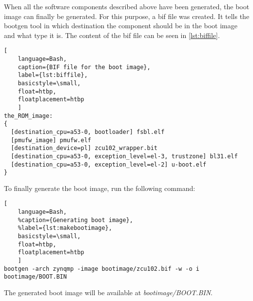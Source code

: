 When all the software components described above have been generated, the boot image can finally be generated. For this purpose, a \gls{bif} file was created. It tells the bootgen tool in which destination the component should be in the boot image and what type it is. The content of the \gls{bif} file can be seen in \cref{lst:biffile}.
\begin{lstlisting}[
	language=Bash,
	caption={BIF file for the boot image},
	label={lst:biffile},
	basicstyle=\small,
	float=htbp,
	floatplacement=htbp
	]
the_ROM_image:
{
  [destination_cpu=a53-0, bootloader] fsbl.elf
  [pmufw_image] pmufw.elf
  [destination_device=pl] zcu102_wrapper.bit
  [destination_cpu=a53-0, exception_level=el-3, trustzone] bl31.elf
  [destination_cpu=a53-0, exception_level=el-2] u-boot.elf
}
\end{lstlisting}

To finally generate the boot image, run the following command:
\begin{lstlisting}[
	language=Bash,
	%caption={Generating boot image},
	%label={lst:makebootimage},
	basicstyle=\small,
	float=htbp,
	floatplacement=htbp
	]
bootgen -arch zynqmp -image bootimage/zcu102.bif -w -o i bootimage/BOOT.BIN
\end{lstlisting}
\FloatBarrier

The generated boot image will be available at \emph{bootimage/BOOT.BIN}.